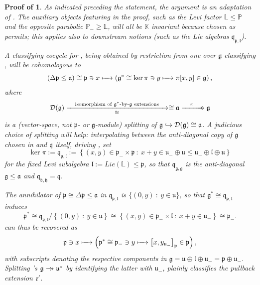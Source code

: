\documentclass[11pt,leqno]{article}
\theoremstyle{plain}
\theoremstyle{plain}
\theoremstyle{plain}
\numberwithin{equation}{section}
\theoremstyle{nonumberplain}
\newcommand\pf[1]{\newtheorem{#1}{Proof of \Cref{#1}}}
\newcommand\bK{{\mathbb K}}
\newcommand\bL{{\mathbb L}}
\newcommand\bP{{\mathbb P}}
\newcommand\cD{{\mathcal D}}
\newcommand\fa{{\mathfrak a}}
\newcommand\fb{{\mathfrak b}}
\newcommand\fe{{\mathfrak e}}
\newcommand\fg{{\mathfrak g}}
\newcommand\fh{{\mathfrak h}}
\newcommand\fl{{\mathfrak l}}
\newcommand\fp{{\mathfrak p}}
\newcommand\fq{{\mathfrak q}}
\newcommand\fu{{\mathfrak u}}
\newcommand\1{{\bf 1}}
\newcommand{\xrightarrowdbl}[2][]{%
  \xrightarrow[#1]{#2}\mathrel{\mkern-14mu}\rightarrow
}
\begin{document}
\pf{th:same.poiss}
\begin{th:same.poiss}
  As indicated preceding the statement, the argument is an adaptation of . The auxiliary objects featuring in the proof, such as the Levi factor $\bL\le \bP$ and the opposite parabolic $\bP_{-}\ge \bL$, will all be $\bK$ invariant because chosen as  permits; this applies also to downstream notions (such as the Lie algebras $\fq_{\fp,\fl}$).
  
  A classifying cocycle for , being obtained by restriction from one over $\fg$ classifying , will be cohomologous to 
  \begin{equation}\label{eq:1cocyc.dscr}    
    \left(\Delta\fp\le \fa\right)
    \cong
    \fp\ni
    x
    \xmapsto{\quad}
    \left(
      \fg^*\cong \ker\pi\ni
      y
      \xmapsto{\quad}
      \pi[x,y]
      \in \fg
    \right),
  \end{equation}
  where
  \begin{equation*}
    \cD(\fg)
    \xrightarrow[\quad\cong\quad]{\quad\text{isomorphism of $\fg^*$-by-$\fg$ extensions}\quad}
    \cong
    \fa
    \xrightarrowdbl{\quad\pi\quad}
    \fg
  \end{equation*}
  is a (vector-space, not $\fp$- or $\fg$-module) splitting of $\fg\lhook\joinrel\to \cD(\fg)\cong \fa$. A judicious choice of splitting will help: interpolating between the anti-diagonal copy of $\fg$ chosen in  and $\fq$ itself, driving , set
  \begin{equation*}
    \ker\pi:=\fq_{\fp,\fl}
    :=
    \left\{(x,y)\in \fp_-\times \fp\ :\ x+y\in \fu_{-}\oplus \fu\le \fu_{-}\oplus \fl\oplus \fu\right\}
  \end{equation*}
  for the fixed Levi subalgebra $\fl:=Lie(\bL)\le \fp$, so that $\fq_{\fg,\fg}$ is the anti-diagonal $\fg\le \fa$ and $\fq_{\fb,\fh}=\fq$.   

  The annihilator of $\fp\cong \Delta\fp\le \fa$ in $\fq_{\fp,\fl}$ is $\{(0,y)\ :\ y\in \fu\}$, so that $\fg^*\cong \fq_{\fp,\fl}$ induces
  \begin{equation*}
    \fp^*
    \cong
    \fq_{\fp,\fl}/\left\{(0,y)\ :\ y\in \fu\right\}
    \cong
    \left\{(x,y)\in \fp_{-}\times \fl\ :\ x+y\in \fu_{-}\right\}
    \cong
    \fp_{-}. 
  \end{equation*}
   can thus be recovered as
  \begin{equation}\label{eq:alt.desc.1cocyc}
    \fp\ni
    x
    \xmapsto{\quad}
    \left(
      \fp^*
      \cong
      \fp_{-}
      \ni
      y
      \xmapsto{\quad}
      \left[x,y_{\fu_{-}}\right]_{\fp}
      \in \fp
    \right),
  \end{equation}
  with subscripts denoting the respective components in $\fg=\fu\oplus \fl\oplus \fu_{-}=\fp\oplus \fu_{-}$. Splitting 's $\fg\xrightarrowdbl{}\fu^*$ by identifying the latter with $\fu_{-}$,  plainly classifies the pullback extension $\fe'$.
\end{th:same.poiss}
\end{document}
